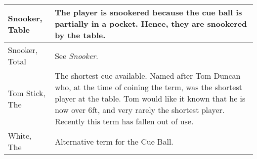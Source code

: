 \begin{center}
\begin{tabular}{  p{}  p{}  }
      Snooker, Table & The player is snookered because the cue ball is partially in a pocket. Hence, they are snookered by the table.\\ \hline
      Snooker, Total & See \emph{Snooker}. \\ \hline
      Tom Stick, The & The shortest cue available. Named after Tom Duncan who, at the time of coining the term, was the shortest player at the table. Tom would like it known that he is now over 6ft, and very rarely the shortest player. Recently this term has fallen out of use. \\ \hline
      White, The & Alternative term for the Cue Ball. \\ \hline
    \end{tabular}
\end{center}
\normalsize
